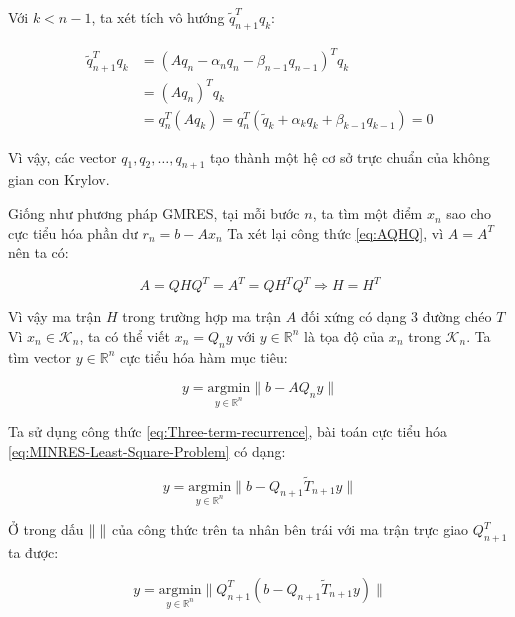 \documentclass[14pt, a4paper]{article}
\numberwithin{equation}{section}
\numberwithin{algorithm}{section}
\numberwithin{figure}{section}
\numberwithin{dl}{section}
\numberwithin{md}{section}
\numberwithin{bd}{section}
\numberwithin{dn}{section}
\numberwithin{hq}{section}
\begin{document}
Với $k < n-1$, ta xét tích vô hướng $\tilde{q}_{n+1}^T q_k$:

\begin{equation}
    \begin{aligned}
        \tilde{q}_{n+1}^T q_k &= (A q_n - \alpha_n q_n - \beta_{n-1} q_{n-1})^T q_k \\
        &= (Aq_n)^T q_k \\
        &= q_n^T (Aq_k)=q_n^T (\tilde{q}_k + \alpha_k q_k + \beta_{k-1} q_{k-1})=0
    \end{aligned}
\end{equation}

Vì vậy, các vector $q_1, q_2, \dots, q_{n+1}$ tạo thành một hệ cơ sở trực chuẩn của không gian con Krylov.

Giống như phương pháp GMRES, tại mỗi bước $n$, ta tìm một điểm $x_n$ sao cho cực tiểu hóa phần dư $r_n=b - Ax_n$
Ta xét lại công thức \ref{eq:AQHQ}, vì $A = A^T$ nên ta có:

\begin{equation}
    A = QHQ^T = A^T = QH^TQ^T \Rightarrow H = H^T
\end{equation}

Vì vậy ma trận $H$ trong trường hợp ma trận $A$ đối xứng có dạng 3 đường chéo $T$
Vì $x_n \in \mathcal{K}_n$, ta có thể viết $x_n = Q_n y$ với $y \in \mathbb{R}^n$ là tọa độ của $x_n$ trong $\mathcal{K}_n$. Ta tìm vector $y \in \mathbb{R}^n$ cực tiểu hóa hàm mục tiêu:

\begin{equation} \label{eq:MINRES-Least-Square-Problem}
    y = \underset{y \in \mathbb{R}^n}{\mathrm{argmin}} \lVert b - AQ_n y \rVert
\end{equation}

Ta sử dụng công thức \ref{eq:Three-term-recurrence}, bài toán cực tiểu hóa \ref{eq:MINRES-Least-Square-Problem} có dạng:

\begin{equation}
    y = \underset{y \in \mathbb{R}^n}{\mathrm{argmin}} \lVert b - Q_{n+1} \widetilde{T}_{n+1} y \rVert
\end{equation}

Ở trong dấu $\lVert \thickspace \rVert$ của công thức trên ta nhân bên trái với ma trận trực giao $Q_{n+1}^T$ ta được:

\begin{equation}
    y = \underset{y \in \mathbb{R}^n}{\mathrm{argmin}} \lVert Q_{n+1}^T(b - Q_{n+1} \widetilde{T}_{n+1} y) \rVert
\end{equation}
\end{document}

